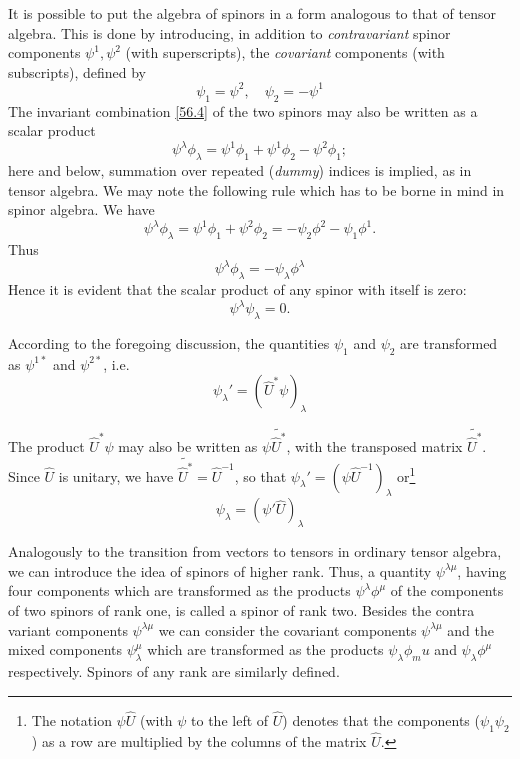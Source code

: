 It is possible to put the algebra of spinors in a form analogous to that of tensor algebra. This is done by introducing, in addition to \textit{contravariant} spinor components $ \psi^1, \psi^2 $ (with superscripts), the \textit{covariant} components (with subscripts), defined by
\begin{equation}\label{56.8}
\psi_1=\psi^2,\quad\psi_2=-\psi^1
\end{equation}
The invariant combination \eqref{56.4} of the two spinors may also be written as a scalar product
\begin{equation}\label{56.9}
\psi^\lambda\phi_\lambda=\psi^1\phi_1+\psi^1\phi_2-\psi^2\phi_1;
\end{equation}
here and below, summation over repeated (\textit{dummy}) indices is implied, as in tensor algebra. We may note the following rule which has to be borne in mind in spinor algebra. We have
\[ \psi^\lambda\phi_\lambda=\psi^1\phi_1+\psi^2\phi_2=-\psi_2\phi^2-\psi_1\phi^1. \]
Thus
\begin{equation}\label{56.10}
\psi^\lambda\phi_\lambda=-\psi_\lambda\phi^\lambda
\end{equation}
Hence it is evident that the scalar product of any spinor with itself is zero:
\begin{equation}\label{56.11}
\psi^\lambda\psi_\lambda=0.
\end{equation}


According to the foregoing discussion, the quantities $\psi_1$ and $\psi_2$ are transformed as $ \psi^{1*} $ and $ \psi^{2*} $, i.e.
\begin{equation}\label{56.12}
\psi_\lambda'=\left(\hat{U}^*\psi \right)_\lambda
\end{equation}


The product $ \hat{U}^*\psi $ may also be written as $ \psi\tilde{\hat{U}^*} $, with the transposed matrix $\tilde{\hat{U}^*}$. Since $\hat{U}$ is unitary, we have $ \tilde{\hat{U}^*}=\hat{U}^{-1} $, so that $ \psi_\lambda'=\left(\psi\hat{U}^{-1}\right)_\lambda $ or\footnote{The notation $\psi\hat{U}$ (with $\psi$ to the left of $\hat{U}$) denotes that the components ($ \psi_1\psi_2 $) as a row are multiplied by the columns of the matrix $\hat{U}$.
}
\begin{equation}\label{56.13}
\psi_\lambda=\left(\psi'\hat{U} \right)_\lambda
\end{equation}


Analogously to the transition from vectors to tensors in ordinary tensor algebra, we can introduce the idea of spinors of higher rank. Thus, a quantity $\psi^{\lambda\mu}$, having four components which are transformed as the products $ \psi^\lambda\phi^\mu $ of the components of two spinors of rank one, is called a spinor of rank two. Besides the contra variant components $\psi^{\lambda\mu}$ we can consider the covariant components $\psi^{\lambda\mu}$ and the mixed components $ \psi^{\mu}_\lambda $ which are transformed as the products $ \psi_\lambda\phi_mu $ and $ \psi_\lambda\phi^\mu $ respectively. Spinors of any rank are similarly defined.

